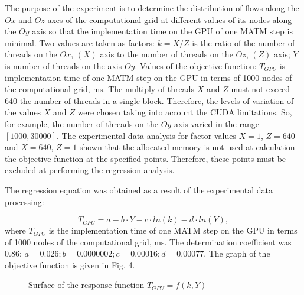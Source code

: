 \documentclass{svproc}
\begin{document}
The purpose of the experiment is to determine the distribution of flows along the $Ox$ and $Oz$ axes of the computational grid at different values of its nodes along the $Oy$ axis so that the implementation time on the GPU of one MATM step is minimal.
Two values are taken as factors: $k=X/Z$ is the ratio of the number of threads on the $Ox$, $(X)$ axis to the number of threads on the $Oz$, $(Z)$ axis; $Y$ is number of threads on the axis $Oy$.
Values of the objective function: $T_{GPU}$ is implementation time of one MATM step on the GPU in terms of 1000 nodes of the computational grid, ms.
The multiply of threads $X$ and $Z$ must not exceed 640-the number of threads in a single block. Therefore, the levels of variation of the values $X$ and $Z$ were chosen taking into account the CUDA limitations.
So, for example, the number of threads on the $Oy$ axis varied in the range $[1000, 30000]$.
The experimental data analysis for factor values $X=1$, $Z=640$ and $X=640$, $Z=1$ shown that the allocated memory is not used at calculation the objective function at the specified points.
Therefore, these points must be excluded at performing the regression analysis.

The regression equation was obtained as a result of the experimental data processing:

\begin{equation}	
	T_{GPU} = a - b\cdot Y - c\cdot ln(k) - d\cdot ln(Y),
\end{equation}
where $T_{GPU}$ is the implementation time of one MATM step on the GPU in terms of 1000 nodes of the computational grid, ms.
The determination coefficient was 0.86; $a=0.026; b=0.0000002; c=0.00016; d=0.00077$. The graph of the objective function is given in Fig. 4.


\begin{figure}[h!]
	\caption{Surface of the response function $T_{GPU} = f(k, Y)$} \label{fig4}
\end{figure}
\end{document}

